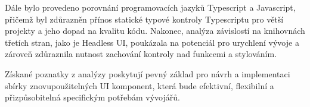 Dále bylo provedeno porovnání programovacích jazyků Typescript a Javascript, přičemž byl zdůrazněn přínos statické typové kontroly Typescriptu pro větší projekty a jeho dopad na kvalitu kódu. Nakonec, analýza závislostí na knihovnách třetích stran, jako je Headless UI, poukázala na potenciál pro urychlení vývoje a zároveň zdůraznila nutnost zachování kontroly nad funkcemi a stylováním.

Získané poznatky z analýzy poskytují pevný základ pro návrh a implementaci sbírky znovupoužitelných UI komponent, která bude efektivní, flexibilní a přizpůsobitelná specifickým potřebám vývojářů.

